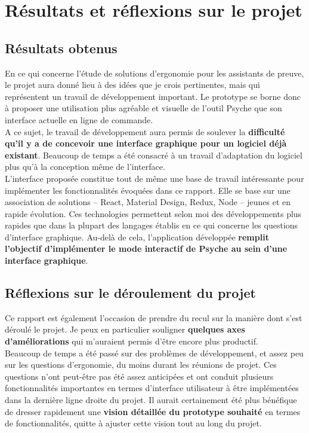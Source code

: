 \section{Résultats et réflexions sur le projet}

\subsection{Résultats obtenus}

En ce qui concerne l'étude de solutions d'ergonomie pour les assistants de preuve, le projet aura donné lieu à des idées que je crois pertinentes, mais qui représentent un travail de développement important. Le prototype se borne donc à proposer une utilisation plus agréable et visuelle de l'outil Psyche que son interface actuelle en ligne de commande.\\

A ce sujet, le travail de développement aura permis de soulever la \textbf{difficulté qu'il y a de concevoir une interface graphique pour un logiciel déjà existant}.  Beaucoup de temps a été consacré à un travail d'adaptation du logiciel plus qu'à la conception même de l'interface.\\

L'interface proposée constitue tout de même une base de travail intéressante pour implémenter les fonctionnalités évoquées dans ce rapport. Elle se base sur une association de solutions -- React, Material Design, Redux, Node -- jeunes et en rapide évolution. Ces technologies permettent selon moi des développements plus rapides que dans la plupart des langages établis en ce qui concerne les questions d'interface graphique. Au-delà de cela, l'application développée \textbf{remplit l'objectif d'implémenter le mode interactif de Psyche au sein d'une interface graphique}.

\subsection{Réflexions sur le déroulement du projet}

Ce rapport est également l'occasion de prendre du recul sur la manière dont s'est déroulé le projet. Je peux en particulier souligner \textbf{quelques axes d'améliorations} qui m'auraient permis d'être encore plus productif.\\

Beaucoup de temps a été passé sur des problèmes de développement, et assez peu sur les questions d'ergonomie, du moins durant les réunions de projet. Ces questions n'ont peut-être pas été assez anticipées et ont conduit plusieurs fonctionnalités importantes en termes d'interface utilisateur à être implémentées dans la dernière ligne droite du projet. Il aurait certainement été plus bénéfique de dresser rapidement une \textbf{vision détaillée du prototype souhaité} en termes de fonctionnalités, quitte à ajuster cette vision tout au long du projet.\\

